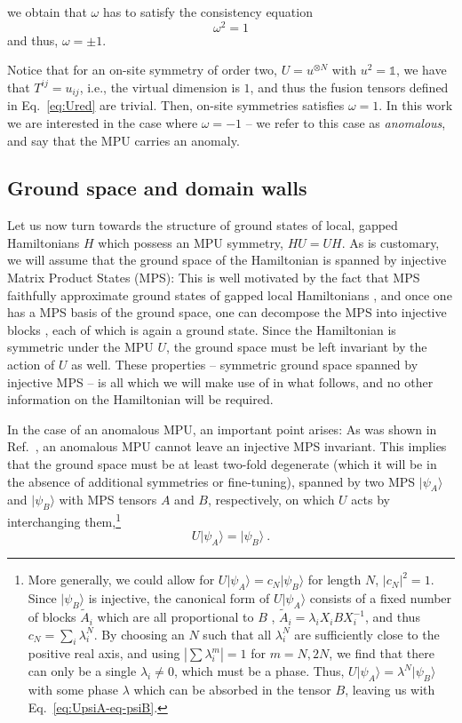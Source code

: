\documentclass[aps,pra,export,nofootinbib]{revtex4-2}
\newcommand{\id}{\mathbb{1}}
\begin{document}
we obtain that $\omega$ has to satisfy the consistency equation 
%
\begin{equation} \label{omegavalues}
    \omega^2 =1  
\end{equation}
and thus, $\omega=\pm1$.
%


Notice that for an on-site symmetry of order two, $U = u^{\otimes N}$ with $u^2 = \id$, we have that $T^{ij}=u_{ij}$, i.e., the virtual dimension is $1$, and thus the fusion tensors
defined in Eq.~\eqref{eq:Ured} are trivial. Then, on-site symmetries satisfies $\omega=1$. In this work we are interested in the case where $\omega = -1$ -- we refer to this case as {\it anomalous}, and say that the MPU carries an anomaly. 


\subsection{Ground space and domain walls}

Let us now turn towards the structure of ground states of local, gapped Hamiltonians $H$ which possess an MPU symmetry, $HU=UH$. As is customary, we will assume that the ground space of the Hamiltonian is spanned by injective Matrix Product States (MPS): This is well motivated by the fact that MPS faithfully approximate ground states of gapped local Hamiltonians \cite{Hastings07A,Hastings07B}, and once one has a MPS basis of the ground space, one can decompose the MPS into injective blocks \cite{PerezGarcia07}, each of which is again a ground state. Since the Hamiltonian is symmetric under the MPU $U$, the ground space must be left invariant by the action of $U$ as well. These properties -- symmetric ground space spanned by injective MPS -- is all which we will make use of in what follows, and no other information on the Hamiltonian will be required. 

In the case of an anomalous MPU, an important point arises: As  was shown in Ref.~, an anomalous MPU cannot leave an injective MPS invariant. This implies that the ground space must be at least two-fold degenerate (which it will be in the absence of additional symmetries or fine-tuning), spanned by two MPS $\lvert\psi_A\rangle$ and $\lvert\psi_B\rangle$ with MPS tensors $A$ and $B$, respectively, on which $U$ acts by interchanging them,\footnote{More generally, we could allow for
$U \lvert \psi_A \rangle = c_N\lvert \psi_B \rangle$ for length $N$, $|c_N|^2=1$.  Since 
$\lvert\psi_B\rangle$ is injective, the canonical form of $U\lvert\psi_A\rangle$ consists of a fixed number of blocks $\tilde A_i$ which are all proportional to $B$ , $\tilde A_i = \lambda_i X_iBX_i^{-1}$, and thus $c_N=\sum_i \lambda_i^N$.
By choosing an $N$ such that all $\lambda_i^{N}$ are sufficiently close to the positive real axis, and using $|\sum\lambda_i^m|=1$ for $m=N,2N$, we find that there can only be a single $\lambda_i\ne0$, which must be a phase. Thus, 
$U \lvert \psi_A \rangle = \lambda^N\lvert \psi_B \rangle$ with some phase $\lambda$ which can be absorbed in the tensor $B$, leaving us with Eq.~\eqref{eq:UpsiA-eq-psiB}.}
\begin{equation}
\label{eq:UpsiA-eq-psiB}
U \lvert \psi_A \rangle = \lvert \psi_B \rangle \ .
\end{equation}
\end{document}
